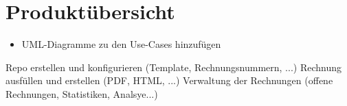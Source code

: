 
\section{Produktübersicht}

\begin{itemize}
	\item UML-Diagramme zu den Use-Cases hinzufügen
\end{itemize}

Repo erstellen und konfigurieren (Template, Rechnungsnummern, ...)
Rechnung ausfüllen und erstellen (PDF, HTML, ...)
Verwaltung der Rechnungen (offene Rechnungen, Statistiken, Analsye...)
